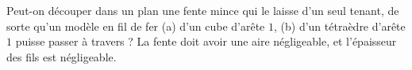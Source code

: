 Peut-on découper dans un plan une fente mince qui le laisse d'un seul tenant, de sorte qu'un modèle en fil de fer (a) d'un cube d'arête $1$, (b) d'un tétraèdre d'arête $1$ puisse passer à travers ? La fente doit avoir une aire négligeable, et l'épaisseur des fils est négligeable.
